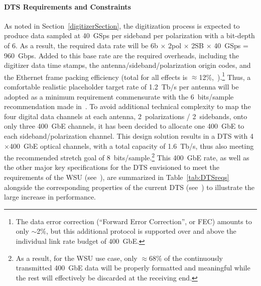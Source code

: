 \paragraph{DTS Requirements and Constraints}
\label{DTSconstraints}
As noted in Section~\ref{digitizerSection}, the digitization process is expected to produce data sampled at 40~GSps per sideband per polarization with a bit-depth of 6. As a result, the required data rate will be 6b $\times$ 2pol $\times$ 2SB $\times$ 40~GSps = 960~Gbps. Added to this base rate are the required overheads, including the digitizer data time stamps, the antenna/sideband/polarization origin codes, and the Ethernet frame packing efficiency (total for all effects is $\approx$12\%,~\cite{ATAC_DSPOT_EICD}).\footnote{The data error correction (``Forward Error Correction'', or FEC) amounts to only $\sim$2\%, but
this additional protocol is supported over and above the individual link rate budget of 400~GbE.} Thus, a comfortable realistic placeholder target rate of 1.2~Tb/s per antenna will be adopted as a minimum requirement commensurate with the 6~bits/sample recommendation made in~\cite{scwg}. To avoid additional technical complexity to map the four digital data channels at each antenna, 2~polarizations / 2~sidebands, onto only three 400~GbE channels, it has been decided to allocate one 400~GbE to each sideband/polarization channel. This design solution results in a DTS with 4$\times$400~GbE optical channels, with a total capacity of 1.6~Tb/s, thus also meeting the recommended stretch goal of 8~bits/sample.\footnote{As a result, for the WSU use case, only $\approx$68\% of the continuously transmitted 400~GbE data will be properly formatted and meaningful while the rest will effectively be discarded at the receiving end.} This 400~GbE rate, as well as the other major key specifications for the DTS envisioned to meet the requirements of the WSU (see~\cite{CD_DTS}), are summarized in Table~\ref{tab:DTSreqs} alongside the corresponding properties of the current DTS (see~\cite{BEreqs}) to illustrate the large increase in performance.



